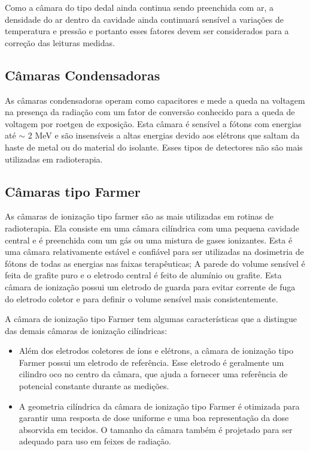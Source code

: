 \documentclass[11pt,a4paper]{article}
\begin{document}
		Como a câmara do tipo dedal ainda continua sendo preenchida com ar, a densidade do ar dentro da cavidade ainda continuará sensível a variações de temperatura e pressão e portanto esses fatores devem ser considerados para a correção das leituras medidas.


	\subsection{Câmaras Condensadoras}

		As câmaras condensadoras operam como capacitores e mede a queda na voltagem na presença da radiação com um fator de conversão conhecido para a queda de voltagem por roetgen de exposição. Esta câmara é sensível a fótons com energias até $\sim$ 2 MeV e são insensíveis a altas energias devido aos elétrons que saltam da haste de metal ou do material do isolante. Esses tipos de detectores não são mais utilizadas em radioterapia. 

	\subsection{Câmaras tipo Farmer}
		
		As câmaras de ionização tipo farmer são as mais utilizadas em rotinas de radioterapia. Ela consiste em uma câmara cilíndrica com uma pequena cavidade central e é preenchida com um gás ou uma mistura de gases ionizantes. Esta é uma câmara relativamente estável e confiável para ser utilizadas na dosimetria de fótons de todas as energias nas faixas terapêuticas; A parede do volume sensível é feita de grafite puro e o eletrodo central é feito de alumínio ou grafite. Esta câmara de ionização possui um eletrodo de guarda para evitar corrente de fuga do eletrodo coletor e para definir o volume sensível mais consistentemente.

		A câmara de ionização tipo Farmer tem algumas características que a distingue das demais câmaras de ionização cilíndricas:

		\begin{itemize}[label=\textcolor{CarnationPink}{$\blacktriangleright$}]
			\item Além dos eletrodos coletores de íons e elétrons, a câmara de ionização tipo Farmer possui um eletrodo de referência. Esse eletrodo é geralmente um cilindro oco no centro da câmara, que ajuda a fornecer uma referência de potencial constante durante as medições.
			\item A geometria cilíndrica da câmara de ionização tipo Farmer é otimizada para garantir uma resposta de dose uniforme e uma boa representação da dose absorvida em tecidos. O tamanho da câmara também é projetado para ser adequado para uso em feixes de radiação.
		\end{itemize}
\end{document}
